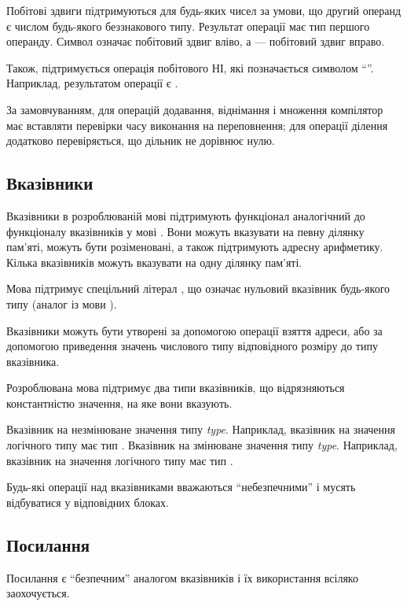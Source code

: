 \documentclass[main.tex]{subfiles}
\begin{document}
Побітові здвиги підтримуються для будь-яких чисел за умови, що другий операнд є числом будь-якого беззнакового типу. Результат операції має тип першого операнду.
Символ \code{\textless\textless} означає побітовий здвиг вліво, а \code{\textgreater\textgreater} --- побітовий здвиг вправо.

Також, підтримується операція побітового НІ, які позначається символом ``\code{!}''. Наприклад, результатом операції  є .

За замовчуванням, для операцій додавання, віднімання і множення компілятор має вставляти перевірки часу виконання на переповнення; для операції ділення додатково перевіряється, що дільник не дорівнює нулю.

\FloatBarrier
\subsection{Вказівники}
Вказівники в розроблюваній мові підтримують функціонал аналогічний до функціоналу вказівників у мові \LangC{}.
Вони можуть вказувати на певну ділянку пам'яті, можуть бути розіменовані, а також підтримують адресну арифметику.
Кілька вказівників можуть вказувати на одну ділянку пам'яті.

Мова підтримує спецільний літерал , що означає нульовий вказівник будь-якого типу (аналог  із мови \LangC{}).

Вказівники можуть бути утворені за допомогою операції взяття адреси, або за допомогою приведення значень числового типу відповідного розміру до типу вказівника.

Розроблювана мова підтримує два типи вказівників, що відрязняються константністю значення, на яке вони вказують.
\begin{itemize}
Вказівник на незмінюване значення типу \emph{type}.
Наприклад, вказівник на значення логічного типу має тип .
Вказівник на змінюване значення типу \emph{type}.
Наприклад, вказівник на значення логічного типу має тип .
\end{itemize}

Будь-які операції над вказівниками вважаються ``небезпечними'' і мусять відбуватися у відповідних блоках.

\FloatBarrier
\subsection{Посилання}
Посилання є ``безпечним'' аналогом вказівників і їх використання всіляко заохочується.
\end{document}
